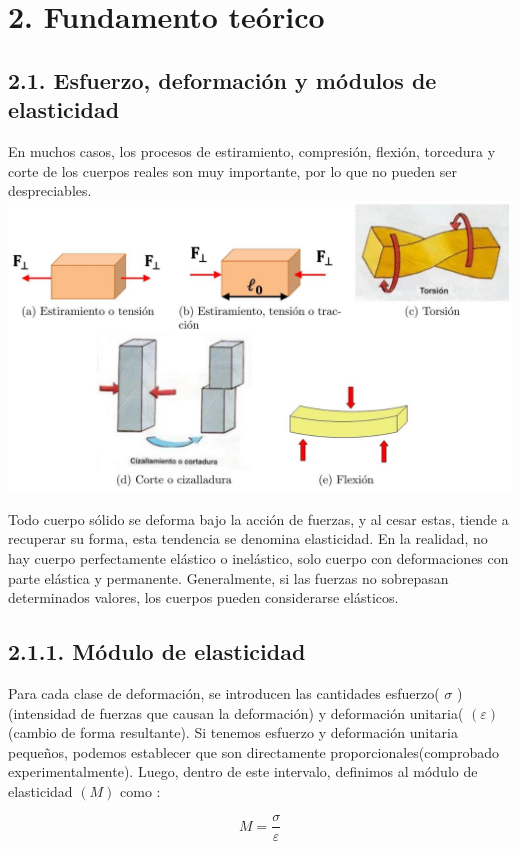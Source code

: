 \documentclass[10pt]{article}
\begin{document}
\section*{2. Fundamento teórico}
\subsection*{2.1. Esfuerzo, deformación y módulos de elasticidad}
En muchos casos, los procesos de estiramiento, compresión, flexión, torcedura y corte de los cuerpos reales son muy importante, por lo que no pueden ser despreciables.\\
\includegraphics[max width=\textwidth, center]{2025_04_28_a9941da8947ada55c6c9g-02}

Todo cuerpo sólido se deforma bajo la acción de fuerzas, y al cesar estas, tiende a recuperar su forma, esta tendencia se denomina elasticidad. En la realidad, no hay cuerpo perfectamente elástico o inelástico, solo cuerpo con deformaciones con parte elástica y permanente. Generalmente, si las fuerzas no sobrepasan determinados valores, los cuerpos pueden considerarse elásticos.

\subsection*{2.1.1. Módulo de elasticidad}
Para cada clase de deformación, se introducen las cantidades esfuerzo( $\sigma$ )(intensidad de fuerzas que causan la deformación) y deformación unitaria( $(\varepsilon)$ (cambio de forma resultante). Si tenemos esfuerzo y deformación unitaria pequeños, podemos establecer que son directamente proporcionales(comprobado experimentalmente). Luego, dentro de este intervalo, definimos al módulo de elasticidad $(M)$ como :


\begin{equation*}
M=\frac{\sigma}{\varepsilon} \tag{1}
\end{equation*}
\end{document}
